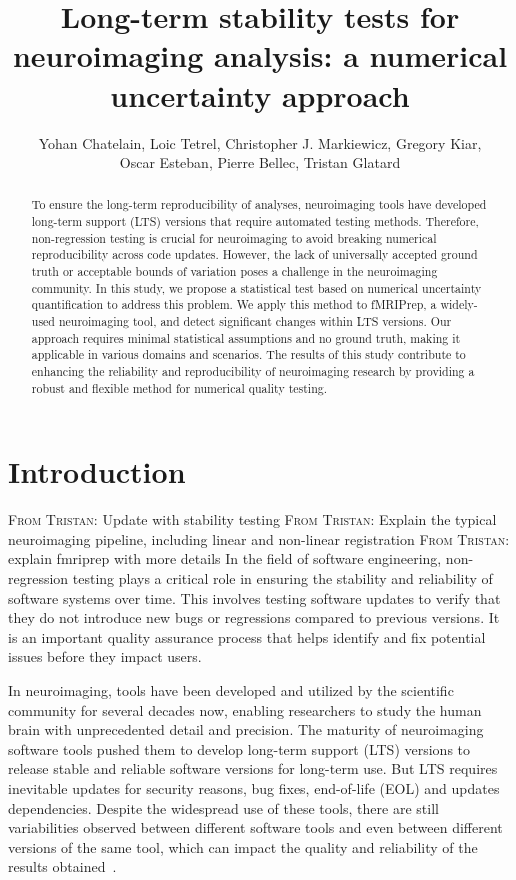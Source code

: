 \documentclass[lettersize,journal]{IEEEtran}
\title{Long-term stability tests for neuroimaging analysis: a numerical uncertainty approach}
\author{Yohan Chatelain, Loic Tetrel, Christopher J. Markiewicz, Gregory Kiar,\\ Oscar Esteban,  Pierre Bellec, Tristan Glatard}
\newcommand{\TG}[1]{\color{blue}\textsc{From Tristan:} #1\color{black}\xspace}
\newcommand{\fmriprep}{fMRIPrep\xspace}
\begin{document}
\maketitle

\begin{abstract}
    To ensure the long-term reproducibility of analyses, neuroimaging tools have developed long-term support (LTS) versions that require automated testing methods. Therefore, non-regression testing is crucial for neuroimaging to avoid breaking numerical reproducibility across code updates. However, the lack of universally accepted ground truth or acceptable bounds of variation poses a challenge in the neuroimaging community. In this study, we propose a statistical test based on numerical uncertainty quantification to address this problem. We apply this method to \fmriprep, a widely-used neuroimaging tool, and detect significant changes within LTS versions. Our approach requires minimal statistical assumptions and no ground truth, making it applicable in various domains and scenarios. The results of this study contribute to enhancing the reliability and reproducibility of neuroimaging research by providing a robust and flexible method for numerical quality testing.
\end{abstract}

\section{Introduction}

\TG{Update with stability testing}
\TG{Explain the typical neuroimaging pipeline, including linear and non-linear registration}
\TG{explain fmriprep with more details}
In the field of software engineering, non-regression testing plays a critical role in ensuring the stability and reliability of software systems over time. This involves testing software updates to verify that they do not introduce new bugs or regressions compared to previous versions. It is an important quality assurance process that helps identify and fix potential issues before they impact users.

In neuroimaging, tools have been developed and utilized by the scientific community for several decades now, enabling researchers to study the human brain with unprecedented detail and precision. The maturity of neuroimaging software tools pushed them to develop long-term support (LTS) versions to release stable and reliable software versions for long-term use. But LTS requires inevitable updates for security reasons, bug fixes, end-of-life (EOL) and updates dependencies. Despite the widespread use of these tools, there are still variabilities observed between different software tools and even between different versions of the same tool, which can impact the quality and reliability of the results obtained~\cite{glatard2015reproducibility, bhagwat2021understanding}.
\end{document}
